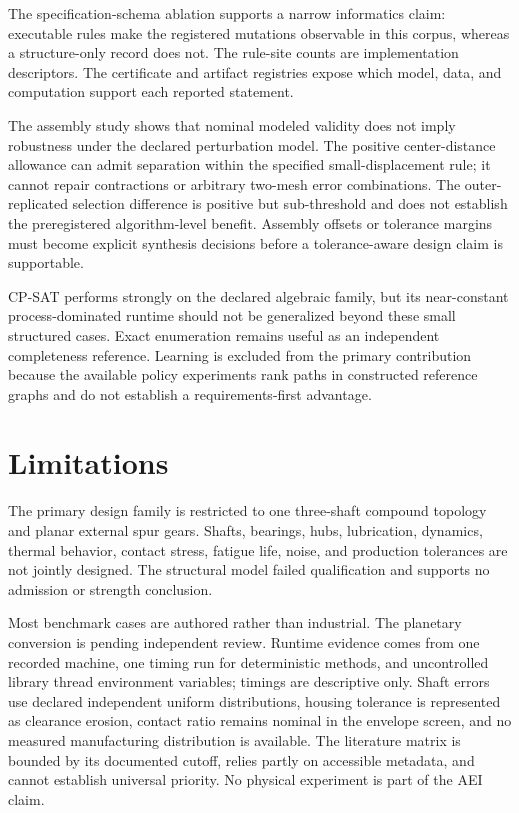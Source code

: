\documentclass[preprint,12pt]{elsarticle}
\begin{document}
The specification-schema ablation supports a narrow informatics claim: executable rules make the registered mutations observable in this corpus, whereas a structure-only record does not. The rule-site counts are implementation descriptors. The certificate and artifact registries expose which model, data, and computation support each reported statement.

The assembly study shows that nominal modeled validity does not imply robustness under the declared perturbation model. The positive center-distance allowance can admit separation within the specified small-displacement rule; it cannot repair contractions or arbitrary two-mesh error combinations. The outer-replicated selection difference is positive but sub-threshold and does not establish the preregistered algorithm-level benefit. Assembly offsets or tolerance margins must become explicit synthesis decisions before a tolerance-aware design claim is supportable.

CP-SAT performs strongly on the declared algebraic family, but its near-constant process-dominated runtime should not be generalized beyond these small structured cases. Exact enumeration remains useful as an independent completeness reference. Learning is excluded from the primary contribution because the available policy experiments rank paths in constructed reference graphs and do not establish a requirements-first advantage.

\section{Limitations}
The primary design family is restricted to one three-shaft compound topology and planar external spur gears. Shafts, bearings, hubs, lubrication, dynamics, thermal behavior, contact stress, fatigue life, noise, and production tolerances are not jointly designed. The structural model failed qualification and supports no admission or strength conclusion.

Most benchmark cases are authored rather than industrial. The planetary conversion is pending independent review. Runtime evidence comes from one recorded machine, one timing run for deterministic methods, and uncontrolled library thread environment variables; timings are descriptive only. Shaft errors use declared independent uniform distributions, housing tolerance is represented as clearance erosion, contact ratio remains nominal in the envelope screen, and no measured manufacturing distribution is available. The literature matrix is bounded by its documented cutoff, relies partly on accessible metadata, and cannot establish universal priority. No physical experiment is part of the AEI claim.
\end{document}
